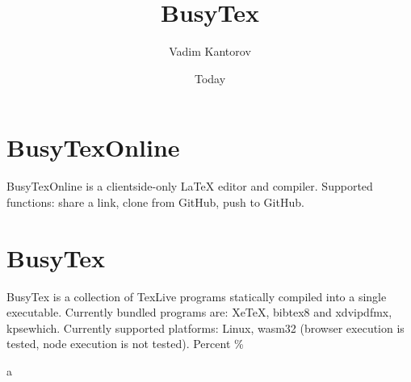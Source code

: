 \documentclass[11pt]{article}
\begin{document}
\title{BusyTex}
\author{Vadim Kantorov}
\date{Today}
\maketitle

\section{BusyTexOnline}
BusyTexOnline is a clientside-only LaTeX editor and compiler. Supported functions: share a link, clone from GitHub, push to GitHub. 

\section{BusyTex}
BusyTex is a collection of TexLive programs statically compiled into a single executable. Currently bundled programs are: XeTeX, bibtex8 and xdvipdfmx, kpsewhich. Currently supported platforms: Linux, wasm32 (browser execution is tested, node execution is not tested). Percent \%

a%

\end{document}
